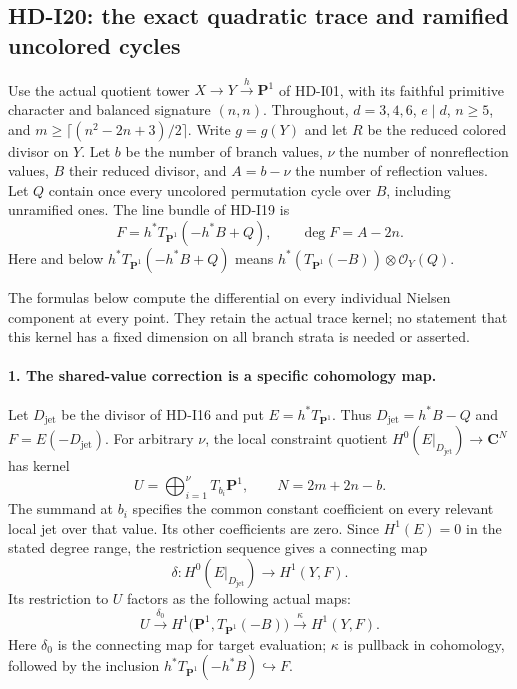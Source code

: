 \subsection{HD-I20: the exact quadratic trace and ramified uncolored cycles}
\label{sec:HD-I20}

Use the actual quotient tower $X\to Y\xrightarrow{h}\mathbf P^1$
of HD-I01, with its faithful primitive character and balanced
signature $(n,n)$. Throughout, $d=3,4,6$, $e\mid d$, $n\geq5$,
and $m\geq\lceil(n^2-2n+3)/2\rceil$. Write $g=g(Y)$ and
let $R$ be the reduced colored divisor on $Y$. Let $b$ be the
number of branch values, $\nu$ the number of nonreflection values,
$B$ their reduced divisor, and $A=b-\nu$ the number of reflection
values. Let $Q$ contain once every uncolored permutation cycle
over $B$, including unramified ones. The line bundle of HD-I19 is
\begin{equation}
 F=h^*T_{\mathbf P^1}(-h^*B+Q),\qquad \deg F=A-2n.
                                                        \tag{I20.1}
\end{equation}
Here and below $h^*T_{\mathbf P^1}(-h^*B+Q)$ means
$h^*(T_{\mathbf P^1}(-B))\otimes\mathcal O_Y(Q)$.

The formulas below compute the differential on every individual
Nielsen component at every point. They retain the actual trace
kernel; no statement that this kernel has a fixed dimension on
all branch strata is needed or asserted.

\paragraph{1. The shared-value correction is a specific cohomology map.}
Let $D_{\mathrm{jet}}$ be the divisor of HD-I16 and put
$E=h^*T_{\mathbf P^1}$. Thus
$D_{\mathrm{jet}}=h^*B-Q$ and $F=E(-D_{\mathrm{jet}})$.
For arbitrary $\nu$, the local constraint quotient
$H^0(E|_{D_{\mathrm{jet}}})\to\mathbf C^N$ has kernel
\[
 U=\bigoplus_{i=1}^{\nu}T_{b_i}\mathbf P^1,
       \qquad N=2m+2n-b.
\]
The summand at $b_i$ specifies the common constant coefficient
on every relevant local jet over that value. Its other coefficients
are zero. Since $H^1(E)=0$ in the stated degree range, the
restriction sequence gives a connecting map
\[
 \delta:H^0(E|_{D_{\mathrm{jet}}})\longrightarrow H^1(Y,F).
\]
Its restriction to $U$ factors as the following actual maps:
\begin{equation}
 U\xrightarrow{\delta_0}
 H^1\bigl(\mathbf P^1,T_{\mathbf P^1}(-B)\bigr)
 \xrightarrow{\ \kappa\ }H^1(Y,F).                    \tag{I20.2}
\end{equation}
Here $\delta_0$ is the connecting map for target evaluation;
$\kappa$ is pullback in cohomology, followed by the inclusion
$h^*T_{\mathbf P^1}(-h^*B)\hookrightarrow F$.

